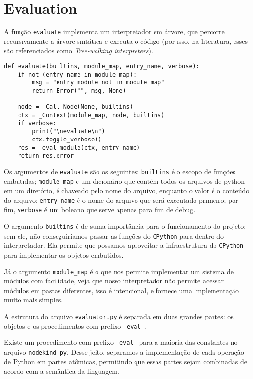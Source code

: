 \section{Evaluation}

A função \verb|evaluate| implementa um interpretador em
árvore, que percorre recursivamente a árvore sintática
e executa o código (por isso, na literatura, esses
são referenciados como \textit{Tree-walking interpreters}).

\begin{lstlisting}
def evaluate(builtins, module_map, entry_name, verbose):
    if not (entry_name in module_map):
        msg = "entry module not in module map"
        return Error("", msg, None)

    node = _Call_Node(None, builtins)
    ctx = _Context(module_map, node, builtins)
    if verbose:
        print("\nevaluate\n")
        ctx.toggle_verbose()
    res = _eval_module(ctx, entry_name)
    return res.error
\end{lstlisting}

Os argumentos de \verb|evaluate| são os seguintes:
\verb|builtins| é o escopo de funções embutidas;
\verb|module_map| é um dicionário que contém todos os
arquivos de python em um diretório, é chaveado pelo nome
do arquivo, enquanto o valor é o conteúdo do arquivo;
\verb|entry_name| é o nome do arquivo que será executado
primeiro; por fim, \verb|verbose| é um boleano que serve
apenas para fim de debug.

O argumento \verb|builtins| é de suma importância para o
funcionamento do projeto: sem ele, não conseguiríamos passar
as funções do \texttt{CPython} para dentro do interpretador.
Ela permite que possamos aproveitar a infraestrutura do
\texttt{CPython} para implementar os objetos embutidos.

Já o argumento \verb|module_map| é o que nos permite
implementar um sistema de módulos com facilidade, veja
que nosso interpretador não permite acessar módulos
em pastas diferentes, isso é intencional, e fornece
uma implementação muito mais simples.

A estrutura do arquivo \verb|evaluator.py| é separada em duas
grandes partes: os objetos e os procedimentos com prefixo
\verb|_eval_|.

Existe um procedimento com prefixo \verb|_eval_| para a
maioria das constantes no arquivo \verb|nodekind.py|.
Desse jeito, separamos a implementação de cada operação
de Python em partes atômicas, permitindo que essas partes
sejam combinadas de acordo com a semântica da linguagem.


